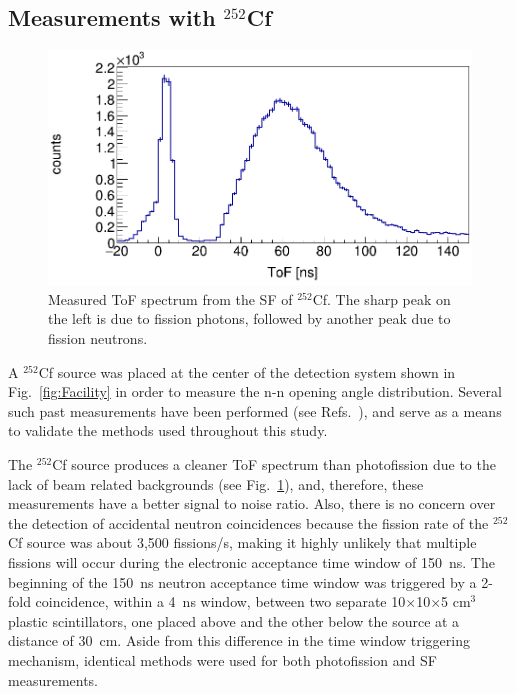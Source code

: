 \subsection{Measurements with $^{252}$Cf}
\begin{figure}[h]
\includegraphics[width=\figsize\textwidth]{Cf252ToF.png}
\caption{Measured ToF spectrum from the SF of $^{252}$Cf. The sharp peak on the left is due to fission photons, followed by another peak due to fission neutrons.}
\label{fig:Cf252ToF}
\end{figure}
A $^{252}$Cf source was placed at the center of the detection system shown in Fig.~\ref{fig:Facility} in order to measure the n-n opening angle distribution.
Several such past measurements have been performed (see Refs.~\cite{1975Cf252, Pozzi2014, 2008CF252, Verbeke2018}), and serve as a means to validate the methods used throughout this study.

The $^{252}$Cf source produces a cleaner ToF spectrum than photofission due to the lack of beam related backgrounds (see Fig.~\ref{fig:Cf252ToF}), and, therefore, these measurements have a better signal to noise ratio.
Also, there is no concern over the detection of accidental neutron coincidences because the fission rate of the $^{252}$Cf source was about 3,500 fissions/s, making it highly unlikely that multiple fissions will occur during the electronic acceptance time window of 150~ns.
The beginning of the 150~ns neutron acceptance time window was triggered by a 2-fold coincidence, within a 4~ns window, between two separate 10$\times$10$\times$5 cm$^3$ plastic scintillators, one placed above and the other below the source at a distance of 30~cm.
Aside from this difference in the time window triggering mechanism, identical methods were used for both photofission and SF measurements.
\FloatBarrier